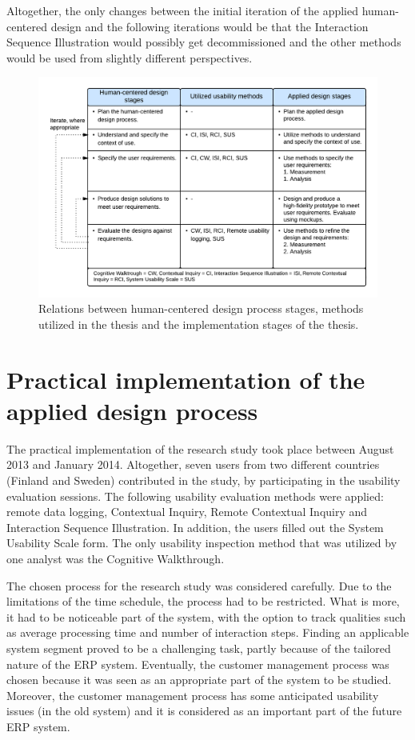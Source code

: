 \documentclass[12pt,a4paper,oneside,pdftex]{report}
\begin{document}
Altogether, the only changes between the initial iteration of the applied human-centered design and the following iterations would be that the Interaction Sequence Illustration would possibly get decommissioned and the other methods would be used from slightly different perspectives. 

\begin{figure}[H]
  	\centerline{
    	\includegraphics[width=1.3\textwidth]{./images/applied_hcd_process.png}
    	}
  	\caption{Relations between human-centered design process stages, methods utilized in the thesis and the implementation stages of the thesis.}
	\label{fig:hcd_process}
\end{figure}



\section{Practical implementation of the applied design process}
 \label{sec:implementation}

    
The practical implementation of the research study took place between August 2013 and January 2014. Altogether, seven users from two different countries (Finland and Sweden) contributed in the study, by participating in the usability evaluation sessions. The following usability evaluation methods were applied: remote data logging, Contextual Inquiry, Remote Contextual Inquiry and Interaction Sequence Illustration. In addition, the users filled out the System Usability Scale form. The only usability inspection method that was utilized by one analyst was the Cognitive Walkthrough.

The chosen process for the research study was considered carefully. Due to the limitations of the time schedule, the process had to be restricted. What is more, it had to be noticeable part of the system, with the option to track qualities such as average processing time and number of interaction steps. Finding an applicable system segment proved to be a challenging task, partly because of the tailored nature of the ERP system. Eventually, the customer management process was chosen because it was seen as an appropriate part of the system to be studied. Moreover, the customer management process has some anticipated usability issues (in the old system) and it is considered as an important part of the future ERP system.
\end{document}

